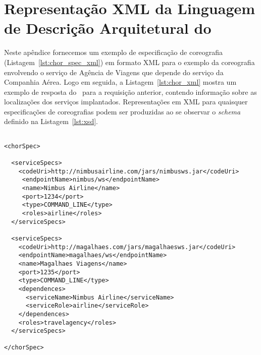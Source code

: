 \chapter{Representação XML da Linguagem de Descrição Arquitetural do \ee}
\label{ape:xml}

Neste apêndice fornecemos um exemplo de especificação de coreografia (Listagem~\ref{lst:chor_spec_xml}) em formato XML para o exemplo da coreografia envolvendo o serviço de Agência de Viagens que depende do serviço da Companhia Aérea. Logo em seguida, a Listagem~\ref{lst:chor_xml} mostra um exemplo de resposta do \ee\ para a requisição anterior, contendo informação sobre as localizações dos serviços implantados. Representações em XML para quaisquer especificações de coreografias podem ser produzidas ao se observar o \emph{schema} definido na Listagem~\ref{lst:xsd}.

\lstset{language=XML}

{\footnotesize
\begin{lstlisting}[frame=trbl, label=lst:chor_spec_xml, caption=Exemplo de representação XML da classe \textsf{ChorSpec}]

<chorSpec>

  <serviceSpecs>
    <codeUri>http://nimbusairline.com/jars/nimbusws.jar</codeUri>
     <endpointName>nimbus/ws</endpointName>
     <name>Nimbus Airline</name>
     <port>1234</port>
     <type>COMMAND_LINE</type>
     <roles>airline</roles>
  </serviceSpecs>
  
  <serviceSpecs>
    <codeUri>http://magalhaes.com/jars/magalhaesws.jar</codeUri>
    <endpointName>magalhaes/ws</endpointName>
    <name>Magalhaes Viagens</name>
    <port>1235</port>
    <type>COMMAND_LINE</type>
    <dependences>
      <serviceName>Nimbus Airline</serviceName>
      <serviceRole>airline</serviceRole>
    </dependences>
    <roles>travelagency</roles>
  </serviceSpecs>
  
</chorSpec>
\end{lstlisting}
}


